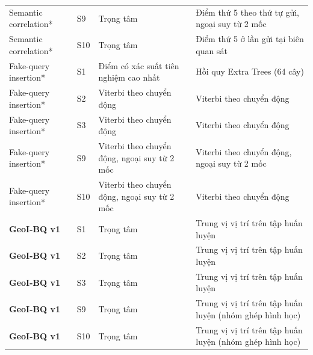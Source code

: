 \begin{longtable}{@{}P{3.1cm}P{.7cm}P{5.678cm}P{5.678cm}@{}}
Semantic correlation* & S9 & Trọng tâm & Điểm thứ 5 theo thứ tự gửi, ngoại suy từ 2 mốc \\
Semantic correlation* & S10 & Trọng tâm & Điểm thứ 5 ở lần gửi tại biên quan sát \\
Fake-query insertion* & S1 & Điểm có xác suất tiên nghiệm cao nhất & Hồi quy Extra Trees (64 cây) \\
Fake-query insertion* & S2 & Viterbi theo chuyển động & Viterbi theo chuyển động \\
Fake-query insertion* & S3 & Viterbi theo chuyển động & Viterbi theo chuyển động \\
Fake-query insertion* & S9 & Viterbi theo chuyển động, ngoại suy từ 2 mốc & Viterbi theo chuyển động, ngoại suy từ 2 mốc \\
Fake-query insertion* & S10 & Viterbi theo chuyển động, ngoại suy từ 2 mốc & Viterbi theo chuyển động \\
\textbf{GeoI-BQ v1} & S1 & Trọng tâm & Trung vị vị trí trên tập huấn luyện \\
\textbf{GeoI-BQ v1} & S2 & Trọng tâm & Trung vị vị trí trên tập huấn luyện \\
\textbf{GeoI-BQ v1} & S3 & Trọng tâm & Trung vị vị trí trên tập huấn luyện \\
\textbf{GeoI-BQ v1} & S9 & Trọng tâm & Trung vị vị trí trên tập huấn luyện (nhóm ghép hình học) \\
\textbf{GeoI-BQ v1} & S10 & Trọng tâm & Trung vị vị trí trên tập huấn luyện (nhóm ghép hình học) \\
\end{longtable}\endgroup\par
